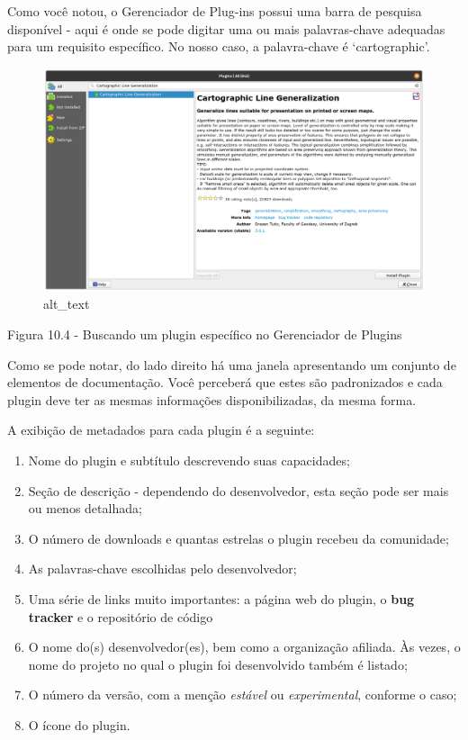 \documentclass[
]{book}
\providecommand{\tightlist}{%
  \setlength{\itemsep}{0pt}\setlength{\parskip}{0pt}}
\begin{document}
Como você notou, o Gerenciador de Plug-ins possui uma barra de pesquisa disponível - aqui é onde se pode digitar uma ou mais palavras-chave adequadas para um requisito específico. No nosso caso, a palavra-chave é `cartographic'.

\begin{figure}
\centering
\includegraphics{media/modulo10/fig104.png}
\caption{alt\_text}
\end{figure}

Figura 10.4 - Buscando um plugin específico no Gerenciador de Plugins

Como se pode notar, do lado direito há uma janela apresentando um conjunto de elementos de documentação. Você perceberá que estes são padronizados e cada plugin deve ter as mesmas informações disponibilizadas, da mesma forma.

A exibição de metadados para cada plugin é a seguinte:

\begin{enumerate}
\def\labelenumi{\arabic{enumi}.}
\tightlist
\item
  Nome do plugin e subtítulo descrevendo suas capacidades;
\item
  Seção de descrição - dependendo do desenvolvedor, esta seção pode ser mais ou menos detalhada;
\item
  O número de downloads e quantas estrelas o plugin recebeu da comunidade;
\item
  As palavras-chave escolhidas pelo desenvolvedor;
\item
  Uma série de links muito importantes: a página web do plugin, o \textbf{bug tracker} e o repositório de código
\item
  O nome do(s) desenvolvedor(es), bem como a organização afiliada. Às vezes, o nome do projeto no qual o plugin foi desenvolvido também é listado;
\item
  O número da versão, com a menção \emph{estável} ou \emph{experimental}, conforme o caso;
\item
  O ícone do plugin.
\end{enumerate}
\end{document}
